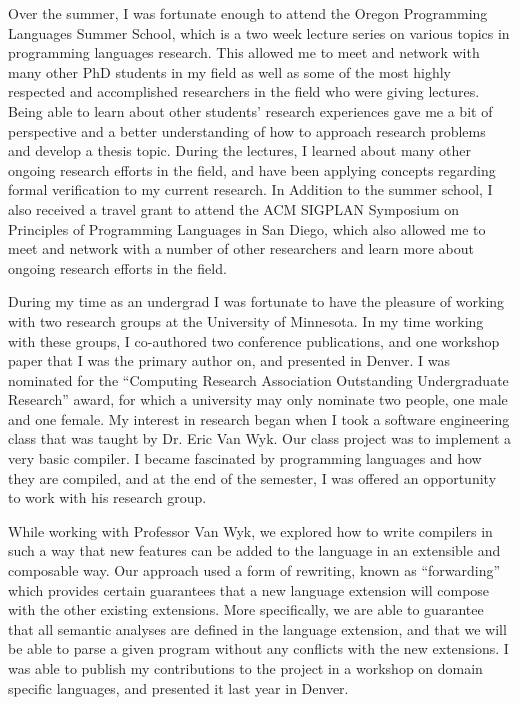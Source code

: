 \documentclass[12pt]{article}
\begin{document}
Over the summer, I was fortunate enough to attend the Oregon Programming Languages Summer School, which is a two week lecture series on various topics in programming languages research.  This allowed me to meet and network with many other PhD students in my field as well as some of the most highly respected and accomplished researchers in the field who were giving lectures.  Being able to learn about other students' research experiences gave me a bit of perspective and a better understanding of how to approach research problems and develop a thesis topic.  During the lectures, I learned about many other ongoing research efforts in the field, and have been applying concepts regarding formal verification to my current research. In Addition to the summer school, I also received a travel grant to attend the ACM SIGPLAN Symposium on Principles of Programming Languages in San Diego, which also allowed me to meet and network with a number of other researchers and learn more about ongoing research efforts in the field.  

During my time as an undergrad I was fortunate to have the pleasure of working with two research groups at the University of Minnesota. In my time working with these groups, I co-authored two conference publications, and one workshop paper that I was the primary author on, and presented in Denver.  I was nominated for the ``Computing Research Association Outstanding Undergraduate Research'' award, for which a university may only nominate two people, one male and one female. My interest in research began when I took a software engineering class that was taught by Dr. Eric Van Wyk. Our class project was to implement a very basic compiler. I became fascinated by programming languages and how they are compiled, and at the end of the semester, I was offered an opportunity to work with his research group.

While working with Professor Van Wyk, we explored how to write compilers in such a way that new features can be added to the language in an extensible and composable way. Our approach used a form of rewriting, known as ``forwarding'' which provides certain guarantees that a new language extension will compose with the other existing extensions. More specifically, we are able to guarantee that all semantic analyses are defined in the language extension, and that we will be able to parse a given program without any conflicts with the new extensions. I was able to publish my contributions to the project in a workshop on domain specific languages, and presented it last year in Denver.  
\end{document}
